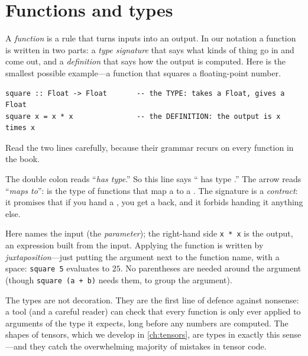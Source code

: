 \section{Functions and types}

A \emph{function} is a rule that turns inputs into an output. In our notation a
function is written in two parts: a \emph{type signature} that says what kinds of
thing go in and come out, and a \emph{definition} that says how the output is
computed. Here is the smallest possible example---a function that squares a
floating-point number.

\begin{lstlisting}[style=l4style]
square :: Float -> Float       -- the TYPE: takes a Float, gives a Float
square x = x * x               -- the DEFINITION: the output is x times x
\end{lstlisting}

Read the two lines carefully, because their grammar recurs on every function in
the book.

\begin{description}[style=nextline,leftmargin=1.5em]
  \item[The signature \code{square :: Float -> Float}.] The
  double colon \code{::} reads ``\emph{has type}.'' So this line says
  `` has type .'' The arrow \code{->} reads
  ``\emph{maps to}'':  is the type of functions that map a
   to a . The signature is a \emph{contract}: it promises
  that if you hand  a , you get a  back, and
  it forbids handing it anything else.
  \item[The definition \code{square x = x * x}.] Here 
  names the input (the \emph{parameter}); the right-hand side \lstinline[style=l4style]|x * x|
  is the output, an expression built from the input. Applying the function is
  written by \emph{juxtaposition}---just putting the argument next to the function
  name, with a space: \lstinline[style=l4style]|square 5| evaluates to $25$. No
  parentheses are needed around the argument (though \lstinline[style=l4style]|square (a + b)|
  needs them, to group the argument).
\end{description}

\noindent The types are not decoration. They are the first line of defence
against nonsense: a tool (and a careful reader) can check that every function is
only ever applied to arguments of the type it expects, long before any numbers
are computed. The shapes of tensors, which we develop in \cref{ch:tensors}, are
types in exactly this sense---and they catch the overwhelming majority of
mistakes in tensor code.

